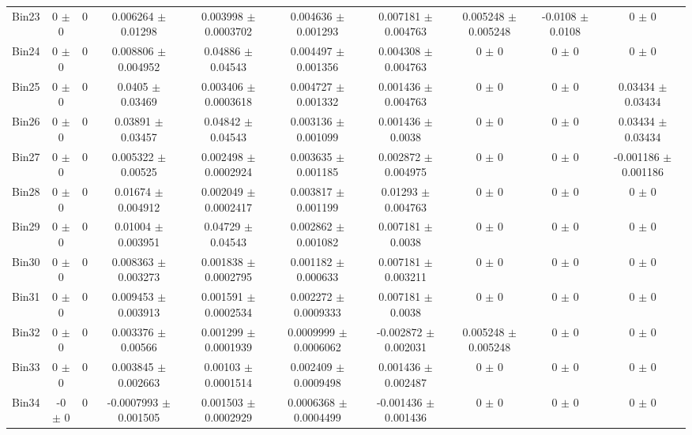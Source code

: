 \begin{tabular}{@{\extracolsep{4pt}}lccccccccc@{}}
     Bin23 & 0 $\pm$ 0 & 0 & 0.006264 $\pm$ 0.01298 & 0.003998 $\pm$ 0.0003702 & 0.004636 $\pm$ 0.001293 & 0.007181 $\pm$ 0.004763 & 0.005248 $\pm$ 0.005248 & -0.0108 $\pm$ 0.0108 & 0 $\pm$ 0 \\ 
     Bin24 & 0 $\pm$ 0 & 0 & 0.008806 $\pm$ 0.004952 & 0.04886 $\pm$ 0.04543 & 0.004497 $\pm$ 0.001356 & 0.004308 $\pm$ 0.004763 & 0 $\pm$ 0 & 0 $\pm$ 0 & 0 $\pm$ 0 \\ 
     Bin25 & 0 $\pm$ 0 & 0 & 0.0405 $\pm$ 0.03469 & 0.003406 $\pm$ 0.0003618 & 0.004727 $\pm$ 0.001332 & 0.001436 $\pm$ 0.004763 & 0 $\pm$ 0 & 0 $\pm$ 0 & 0.03434 $\pm$ 0.03434 \\ 
     Bin26 & 0 $\pm$ 0 & 0 & 0.03891 $\pm$ 0.03457 & 0.04842 $\pm$ 0.04543 & 0.003136 $\pm$ 0.001099 & 0.001436 $\pm$ 0.0038 & 0 $\pm$ 0 & 0 $\pm$ 0 & 0.03434 $\pm$ 0.03434 \\ 
     Bin27 & 0 $\pm$ 0 & 0 & 0.005322 $\pm$ 0.00525 & 0.002498 $\pm$ 0.0002924 & 0.003635 $\pm$ 0.001185 & 0.002872 $\pm$ 0.004975 & 0 $\pm$ 0 & 0 $\pm$ 0 & -0.001186 $\pm$ 0.001186 \\ 
     Bin28 & 0 $\pm$ 0 & 0 & 0.01674 $\pm$ 0.004912 & 0.002049 $\pm$ 0.0002417 & 0.003817 $\pm$ 0.001199 & 0.01293 $\pm$ 0.004763 & 0 $\pm$ 0 & 0 $\pm$ 0 & 0 $\pm$ 0 \\ 
     Bin29 & 0 $\pm$ 0 & 0 & 0.01004 $\pm$ 0.003951 & 0.04729 $\pm$ 0.04543 & 0.002862 $\pm$ 0.001082 & 0.007181 $\pm$ 0.0038 & 0 $\pm$ 0 & 0 $\pm$ 0 & 0 $\pm$ 0 \\ 
     Bin30 & 0 $\pm$ 0 & 0 & 0.008363 $\pm$ 0.003273 & 0.001838 $\pm$ 0.0002795 & 0.001182 $\pm$ 0.000633 & 0.007181 $\pm$ 0.003211 & 0 $\pm$ 0 & 0 $\pm$ 0 & 0 $\pm$ 0 \\ 
     Bin31 & 0 $\pm$ 0 & 0 & 0.009453 $\pm$ 0.003913 & 0.001591 $\pm$ 0.0002534 & 0.002272 $\pm$ 0.0009333 & 0.007181 $\pm$ 0.0038 & 0 $\pm$ 0 & 0 $\pm$ 0 & 0 $\pm$ 0 \\ 
     Bin32 & 0 $\pm$ 0 & 0 & 0.003376 $\pm$ 0.00566 & 0.001299 $\pm$ 0.0001939 & 0.0009999 $\pm$ 0.0006062 & -0.002872 $\pm$ 0.002031 & 0.005248 $\pm$ 0.005248 & 0 $\pm$ 0 & 0 $\pm$ 0 \\ 
     Bin33 & 0 $\pm$ 0 & 0 & 0.003845 $\pm$ 0.002663 & 0.00103 $\pm$ 0.0001514 & 0.002409 $\pm$ 0.0009498 & 0.001436 $\pm$ 0.002487 & 0 $\pm$ 0 & 0 $\pm$ 0 & 0 $\pm$ 0 \\ 
     Bin34 & -0 $\pm$ 0 & 0 & -0.0007993 $\pm$ 0.001505 & 0.001503 $\pm$ 0.0002929 & 0.0006368 $\pm$ 0.0004499 & -0.001436 $\pm$ 0.001436 & 0 $\pm$ 0 & 0 $\pm$ 0 & 0 $\pm$ 0 \\ 

\end{tabular}
